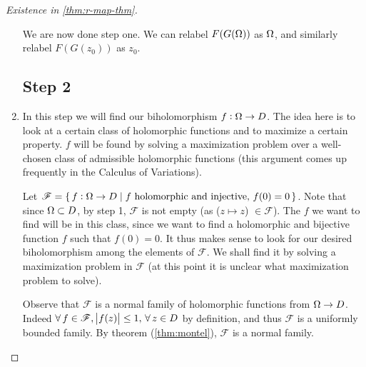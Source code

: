 \begin{proof}[Existence in \ref{thm:r-map-thm}]
\begin{enumerate}
\begin{center}
\end{center}

We are now done step one. We can relabel $F(G(\Omega))$ as $\Omega$, and similarly relabel $F(G(z_0))$ as $z_0$. 

\subsection{Step 2}

\item In this step we will find our biholomorphism $f: \Omega \to D$. The idea here is to look at a certain class of holomorphic functions and to maximize a certain property. $f$ will be found by solving a maximization problem over a well-chosen class of admissible holomorphic functions (this argument comes up frequently in the Calculus of Variations).

Let $\mathscr{F} = \set{ f: \Omega\to D \mid f \text{ holomorphic and injective, } f(0) = 0}$. Note that since $\Omega \subset D$, by step 1, $\mathscr{F}$ is not empty (as ($z\mapsto z$) $\in \mathscr{F}$). The $f$ we want to find will be in this class, since we want to find a holomorphic and bijective function $f$ such that $f(0) = 0$. It thus makes sense to look for our desired biholomorphism among the elements of $\mathscr{F}$. We shall find it by solving a maximization problem in $\mathscr{F}$ (at this point it is unclear what maximization problem to solve).

Observe that $\mathscr{F}$ is a normal family of holomorphic functions from $\Omega \to D$. Indeed $\forall \, f \in \mathscr{F}, \, \abs{f(z) } \leq 1, \, \forall \, z \in D$ by definition, and thus $\mathscr{F}$ is a uniformly bounded family. By theorem (\ref{thm:montel}), $\mathscr{F}$ is a normal family.


\end{enumerate}
\end{proof}
